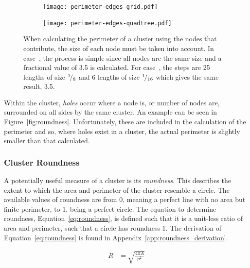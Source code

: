 \begin{figure}[tbh]
	\centering
	\begin{subfigure}[c]{3.5cm}
		\texttt{[image: perimeter-edges-grid.pdf]}
		\caption{}\label{fig:perimeter-edges-grid.pdf}
	\end{subfigure}%
	\quad
	\begin{subfigure}[c]{3.5cm}
		\texttt{[image: perimeter-edges-quadtree.pdf]}
		\caption{}\label{fig:perimeter-edges-quadtree.pdf}
	\end{subfigure}

	\caption[Perimeter size from node edge size.]{When calculating the
		perimeter of a cluster using the nodes that contribute, the size of
		each node must be taken into account. In
		case~, the process is simple since
		all nodes are the same size and a fractional value of 3.5 is
		calculated. For case~, the
		steps are 25 lengths of size ${}^{1}\!/_{8}$ and 6 lengths of size
		${}^{1}\!/_{16}$ which gives the same result,
		3.5.}\label{fig:perimeter-edges}

\end{figure}

Within the cluster, \emph{holes} occur where a node is, or number of nodes are,
surrounded on all sides by the same cluster. An example can be seen in
Figure~\ref{fig:roundness}. Unfortunately, these are included in the
calculation of the perimeter and so, where holes exist in a cluster, the actual
perimeter is slightly smaller than that calculated.

\subsubsection{Cluster Roundness}
\label{ssub:Cluster_Roundness}

A potentially useful measure of a cluster is its \emph{roundness}. This
describes the extent to which the area and perimeter of the cluster resemble a
circle. The available values of roundness are from 0, meaning a perfect line
with no area but finite perimeter, to 1, being a perfect circle. The equation
to determine roundness, Equation~\ref{eq:roundness}, is defined such that it is
a unit-less ratio of area and perimeter, such that a circle has roundness 1.
The derivation of Equation~\ref{eq:roundness} is found in
Appendix~\ref{app:roundness_derivation}.

\begin{align}
	R &= \sqrt{\frac{4\pi A}{p^2}} \label{eq:roundness}
\end{align}

